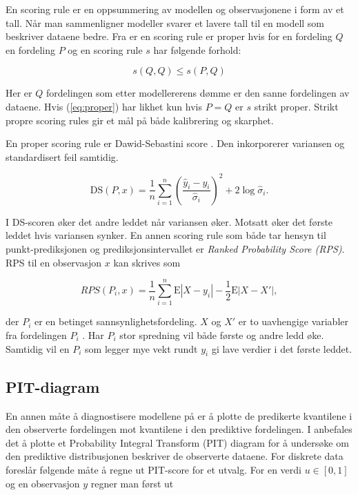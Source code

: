 En scoring rule er en oppsummering av modellen og observasjonene i form av et
tall. Når man sammenligner modeller svarer et lavere tall til en modell som
beskriver dataene bedre. Fra \citep{czado2009predictive} er en scoring rule er
proper hvis for en fordeling $Q$ en fordeling $P$ og en scoring rule $s$ har
følgende forhold:

\begin{equation}
s(Q, Q) \leq s(P, Q)
    \label{eq:proper}
\end{equation}

Her er $Q$ fordelingen som etter modellererens dømme er den sanne fordelingen
av dataene. Hvis (\ref{eq:proper}) har likhet kun hvis $P = Q$ er $s$ strikt
proper. Strikt propre scoring rules gir et mål på både kalibrering og skarphet. 

En proper scoring rule er Dawid-Sebastini score
\parencite{gneiting2007strictly}. Den inkorporerer variansen og standardisert
feil samtidig. 


$$
\mathrm{DS}(P, x) =\frac{1}{n}\sum_{i=1}^n \left(\frac{\hat{y}_i - y_i}{\hat{\sigma}_i}\right)^2 + 2 \log \hat{\sigma}_i.
$$

I DS-scoren øker det andre leddet når variansen øker. Motsatt øker det første
leddet hvis variansen synker. En annen scoring rule som både tar hensyn til
punkt-prediksjonen og prediksjonsintervallet er \textit{Ranked Probability
Score (RPS)}. RPS til en observasjon $x$ kan skrives som 

$$
RPS(P_i,x) = \frac{1}{n}\sum_{i=1}^n \mathrm{E}|X - y_i| - \frac{1}{2}\mathrm{E}|X - X'|,
$$

\noindent
der $P_i$ er en betinget sannsynlighetsfordeling. $X$ og $X'$ er to uavhengige
variabler fra fordelingen $P_i$ \parencite{gneiting2007strictly}. Har $P_i$
stor spredning vil både første og andre ledd øke. Samtidig vil en $P_i$ som
legger mye vekt rundt $y_i$ gi lave verdier i det første leddet.

\subsection{PIT-diagram}

En annen måte å diagnostisere modellene på er å plotte de predikerte kvantilene
i den observerte fordelingen mot kvantilene i den prediktive fordelingen. I
\citep{czado2009predictive} anbefales det å plotte et Probability Integral
Transform (PIT) diagram for å undersøke om den prediktive distribusjonen
beskriver de observerte dataene. For diskrete data foreslår
\citep{czado2009predictive} følgende måte å regne ut PIT-score for et utvalg.
For en verdi $u \in [0, 1]$ og en observasjon $y$ regner man først ut 

